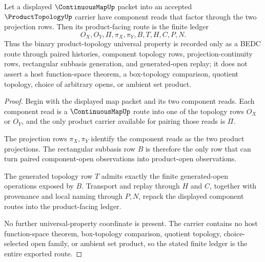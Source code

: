 \begin{theorem}
\label{thm:product-topology-universal-route}
Let a displayed $\ContinuousMapUp$ packet into an accepted $\ProductTopologyUp$ carrier have component reads that factor through the two projection rows. Then its product-facing route is the finite ledger
$$
O_X,O_Y,\Pi,\pi_X,\pi_Y,B,T,H,C,P,N.
$$
Thus the binary product-topology universal property is recorded only as a BEDC route through paired histories, component topology rows, projection-continuity rows, rectangular subbasis generation, and generated-open replay; it does not assert a host function-space theorem, a box-topology comparison, quotient topology, choice of arbitrary opens, or ambient set product.
\end{theorem}
\begin{proof}
Begin with the displayed map packet and its two component reads. Each component read is a $\ContinuousMapUp$ route into one of the topology rows $O_X$ or $O_Y$, and the only product carrier available for pairing those reads is $\Pi$.

The projection rows $\pi_X,\pi_Y$ identify the component reads as the two product projections. The rectangular subbasis row $B$ is therefore the only row that can turn paired component-open observations into product-open observations.

The generated topology row $T$ admits exactly the finite generated-open operations exposed by $B$. Transport and replay through $H$ and $C$, together with provenance and local naming through $P,N$, repack the displayed component routes into the product-facing ledger.

No further universal-property coordinate is present. The carrier contains no host function-space theorem, box-topology comparison, quotient topology, choice-selected open family, or ambient set product, so the stated finite ledger is the entire exported route.
\end{proof}



